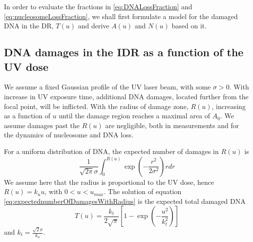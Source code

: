 \documentclass[12pt]{article}
\begin{document}
	In order to evaluate the fractions in \eqref{eq:DNALossFraction} and \eqref{eq:nucleosomeLossFraction}, we shall first formulate a model for the damaged DNA in the DR, $T(u)$ and derive $A(u)$ and $N(u)$ based on it.
	
	\subsection{DNA damages in the IDR as a function of the UV dose}\label{subsection:AccumulationOfDNADamagesInTheIDR}
	We assume a fixed Gaussian profile of the UV laser beam, with some $\sigma>0$. With increase in UV exposure time, additional DNA damages, located further from the focal point, will be inflicted. With the radius of damage zone, $R(u)$, increasing as a function of $u$ until the damage region reaches a maximal area of $A_0$. We assume damages past the $R(u)$ are negligible, both in measurements and for the dynamics of nucleosome and DNA loss.
	
	For a uniform distribution of DNA, the expected number of damages in $R(u)$ is
	\begin{equation}\label{eq:expectednumberOfDamagesWithRadius}
	\frac{1}{\sqrt{2\pi}\sigma}\int_0^{R(u)}\exp\left(-\frac{r^2}{2\sigma^2}\right)rdr
	\end{equation}
	We assume here that the radius is proportional to the UV dose, hence $R(u)=k_uu$, with $0<u<u_{max}$. The solution of equation \eqref{eq:expectednumberOfDamagesWithRadius} is the expected total damaged DNA
	\begin{equation}\label{eq:DNADamagedIDR}
	T(u) = \frac{k_t}{2\sqrt{\pi}}\left[1-\exp\left(-\frac{u^2}{k_t^2}\right)\right]
	\end{equation}
	and $k_t=\frac{\sqrt{2}\sigma}{k_u}$.
	
	
	
\end{document}
